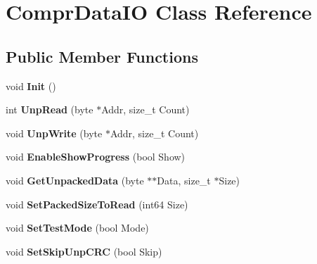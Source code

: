 \hypertarget{class_compr_data_i_o}{\section{Compr\-Data\-I\-O Class Reference}
\label{class_compr_data_i_o}
}
\subsection*{Public Member Functions}
\begin{DoxyCompactItemize}
\item 
\hypertarget{class_compr_data_i_o_a9b34d7306fa75a0e41e0da0823e069c1}{void {\bfseries Init} ()}\label{class_compr_data_i_o_a9b34d7306fa75a0e41e0da0823e069c1}

\item 
\hypertarget{class_compr_data_i_o_a88d35dededb1d3f85245f78c65852404}{int {\bfseries Unp\-Read} (byte $\ast$Addr, size\-\_\-t Count)}\label{class_compr_data_i_o_a88d35dededb1d3f85245f78c65852404}

\item 
\hypertarget{class_compr_data_i_o_a2b4b6df672d70fd474a10bb67c0dac7e}{void {\bfseries Unp\-Write} (byte $\ast$Addr, size\-\_\-t Count)}\label{class_compr_data_i_o_a2b4b6df672d70fd474a10bb67c0dac7e}

\item 
\hypertarget{class_compr_data_i_o_a9d3adbdc2ef1b9178ef5ad8f1c02f33b}{void {\bfseries Enable\-Show\-Progress} (bool Show)}\label{class_compr_data_i_o_a9d3adbdc2ef1b9178ef5ad8f1c02f33b}

\item 
\hypertarget{class_compr_data_i_o_a957f3628403b4f5d4f568e2d3065e579}{void {\bfseries Get\-Unpacked\-Data} (byte $\ast$$\ast$Data, size\-\_\-t $\ast$Size)}\label{class_compr_data_i_o_a957f3628403b4f5d4f568e2d3065e579}

\item 
\hypertarget{class_compr_data_i_o_a9b10c1b9b500743d4cbbe4e2faa4a795}{void {\bfseries Set\-Packed\-Size\-To\-Read} (int64 Size)}\label{class_compr_data_i_o_a9b10c1b9b500743d4cbbe4e2faa4a795}

\item 
\hypertarget{class_compr_data_i_o_ac2f0c203f5c3fb342167709c9cc01072}{void {\bfseries Set\-Test\-Mode} (bool Mode)}\label{class_compr_data_i_o_ac2f0c203f5c3fb342167709c9cc01072}

\item 
\hypertarget{class_compr_data_i_o_a712adbd109666f36a45156ac5c646f6e}{void {\bfseries Set\-Skip\-Unp\-C\-R\-C} (bool Skip)}\label{class_compr_data_i_o_a712adbd109666f36a45156ac5c646f6e}


\end{DoxyCompactItemize}
